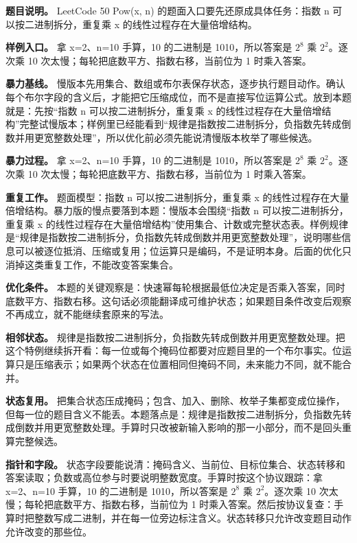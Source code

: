 \textbf{题目说明。} LeetCode 50 Pow(x, n) 的题面入口要先还原成具体任务：指数 n 可以按二进制拆分，重复乘 x 的线性过程存在大量倍增结构。

\textbf{样例入口。} 拿 x=2、n=10 手算，10 的二进制是 1010，所以答案是 \ensuremath{2^{8}} 乘 \ensuremath{2^{2}}。逐次乘 10 次太慢；每轮把底数平方、指数右移，当前位为 1 时乘入答案。

\textbf{暴力基线。} 慢版本先用集合、数组或布尔表保存状态，逐步执行题目动作。确认每个布尔字段的含义后，才能把它压缩成位，而不是直接写位运算公式。放到本题就是：先按“指数 n 可以按二进制拆分，重复乘 x 的线性过程存在大量倍增结构”完整试慢版本；样例里已经能看到“规律是指数按二进制拆分，负指数先转成倒数并用更宽整数处理”，所以优化前必须先能说清慢版本枚举了哪些候选。

\textbf{暴力过程。} 拿 x=2、n=10 手算，10 的二进制是 1010，所以答案是 \ensuremath{2^{8}} 乘 \ensuremath{2^{2}}。逐次乘 10 次太慢；每轮把底数平方、指数右移，当前位为 1 时乘入答案。

\textbf{重复工作。} 题面模型：指数 n 可以按二进制拆分，重复乘 x 的线性过程存在大量倍增结构。暴力版的慢点要落到本题：慢版本会围绕“指数 n 可以按二进制拆分，重复乘 x 的线性过程存在大量倍增结构”使用集合、计数或完整状态表。样例规律是“规律是指数按二进制拆分，负指数先转成倒数并用更宽整数处理”，说明哪些信息可以被逐位抵消、压缩或复用；位运算只是编码，不是证明本身。后面的优化只消掉这类重复工作，不能改变答案集合。

\textbf{优化条件。} 本题的关键观察是：快速幂每轮根据最低位决定是否乘入答案，同时底数平方、指数右移。这句话必须能翻译成可维护状态；如果题目条件改变后观察不再成立，就不能继续套原来的写法。

\textbf{相邻状态。} 规律是指数按二进制拆分，负指数先转成倒数并用更宽整数处理。把这个特例继续拆开看：每一位或每个掩码位都要对应题目里的一个布尔事实。位运算只是压缩表示；如果两个状态在位置相同但掩码不同，未来能力不同，就不能合并。

\textbf{状态复用。} 把集合状态压成掩码；包含、加入、删除、枚举子集都变成位操作，但每一位的题目含义不能丢。本题落点是：规律是指数按二进制拆分，负指数先转成倒数并用更宽整数处理。手算时只改被新输入影响的那一小部分，而不是回头重算完整候选。

\textbf{指针和字段。} 状态字段要能说清：掩码含义、当前位、目标位集合、状态转移和答案读取；负数或高位参与时要说明整数宽度。手算时按这个协议跟踪：拿 x=2、n=10 手算，10 的二进制是 1010，所以答案是 \ensuremath{2^{8}} 乘 \ensuremath{2^{2}}。逐次乘 10 次太慢；每轮把底数平方、指数右移，当前位为 1 时乘入答案。然后按协议复查：手算时把整数写成二进制，并在每一位旁边标注含义。状态转移只允许改变题目动作允许改变的那些位。

